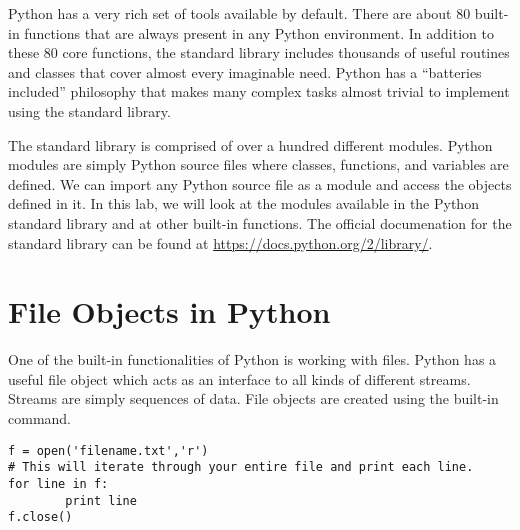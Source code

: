 
Python has a very rich set of tools available by default.
There are about 80 built-in functions that are always present in any Python environment.
In addition to these 80 core functions, the standard library includes thousands of useful routines and classes that cover almost every imaginable need.
Python has a ``batteries included'' philosophy that makes many complex tasks almost trivial to implement using the standard library.


The standard library is comprised of over a hundred different modules.
Python modules are simply Python source files where classes, functions, and variables are defined.
We can import any Python source file as a module and access the objects defined in it.
In this lab, we will look at the modules available in the Python standard library and at other built-in functions. The official documenation for the standard library can be found at \url{https://docs.python.org/2/library/}.


\section*{File Objects in Python}
One of the built-in functionalities of Python is working with files.
Python has a useful file object which acts as an interface to all kinds of different streams. Streams are simply sequences of data.
File objects are created using the built-in  command.

\begin{lstlisting}
f = open('filename.txt','r')
# This will iterate through your entire file and print each line.
for line in f:
        print line
f.close()
\end{lstlisting}

